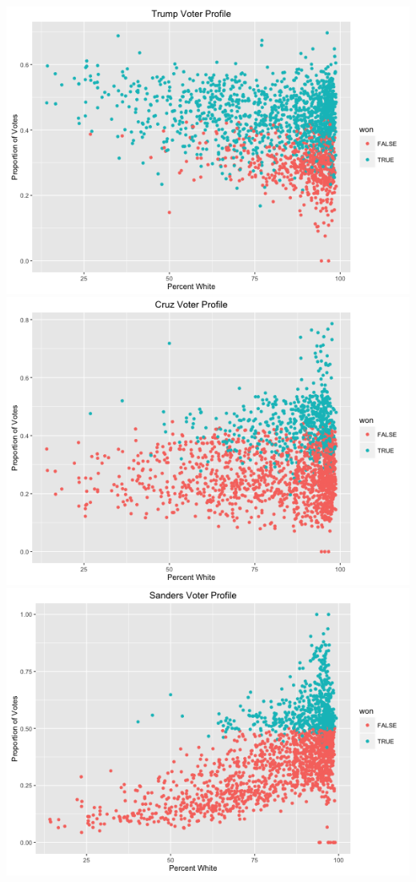 \documentclass[11pt]{article}
\begin{document}
\includegraphics[scale=0.38]{../exploratory_plots/Trump_White.png}
\includegraphics[scale=0.38]{../exploratory_plots/Cruz_White.png}\\
\includegraphics[scale=0.38]{../exploratory_plots/Sanders_White.png}
\end{document}
